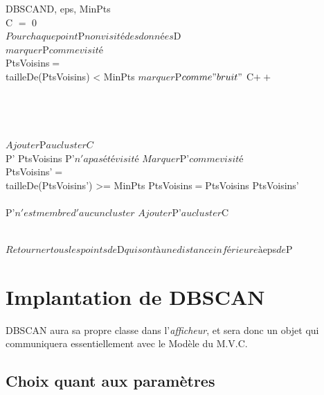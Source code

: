 \documentclass[pdftex,12pt,a4paper]{report}
\begin{document}
\begin{spacing}{1.2}
\begin{pseudocode}{DBSCAN}{D, eps, MinPts}
\\
C $=$ 0\\
$Pour chaque point $P$ non visité des données $D\\
$marquer $P$ comme visité$\\
PtsVoisins$ = $\\
\IF tailleDe(PtsVoisins) < MinPts
\THEN $marquer $P$ comme "bruit"$
\ELSE 
	\BEGIN
		C$++$\\
		\\
	\END\\
\\

\\
	$Ajouter $P$ au cluster C$\\
	\FOREACH P' \in PtsVoisins \DO
			\IF P'$ n'a pas été visité$
			\THEN 
				\BEGIN
					$Marquer $P'$ comme visité$\\
					PtsVoisins'$ = $ \\
					\IF tailleDe(PtsVoisins') >= MinPts
					\THEN PtsVoisins$ = $PtsVoisins \cup PtsVoisins'\\
				\END\\
			\IF P'$ n'est membre d'aucun cluster$
			\THEN $Ajouter $P'$ au cluster $C
\ENDPROCEDURE

\\
	$Retourner tous les points de $D$ qui sont à une distance inférieure à $eps$ de $P
\ENDPROCEDURE
\end{pseudocode}

\section{Implantation de DBSCAN}

DBSCAN aura sa propre classe dans l'\textit{afficheur}, et sera donc un objet qui communiquera essentiellement avec le Modèle du M.V.C.

\subsection{Choix quant aux paramètres}


\end{spacing}
\end{document}
